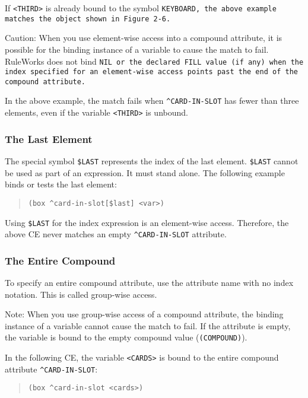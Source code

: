 If \verb|<THIRD>| is already bound to the symbol \tt{KEYBOARD}, the
above example matches the object shown in Figure 2-6.

Caution: When you use element-wise access into a compound attribute,
it is possible for the binding instance of a variable to cause the
match to fail.  RuleWorks does not bind \tt{NIL} or the declared
\tt{FILL} value (if any) when the index specified for an element-wise
access points past the end of the compound attribute.

In the above example, the match fails when \verb|^CARD-IN-SLOT| has
fewer than three elements, even if the variable \verb|<THIRD>| is
unbound.

\subsubsection{The Last Element}

  The special symbol \verb|$LAST| represents the index of the
  last element. \verb|$LAST| cannot be used as part of an
  expression. It must stand alone. The following example
  binds or tests the last element:
\begin{quote}
\begin{verbatim}
(box ^card-in-slot[$last] <var>)
\end{verbatim}
\end{quote}

Using \verb|$LAST| for the index expression is an element-wise
access. Therefore, the above CE never matches an empty
\verb|^CARD-IN-SLOT| attribute.

\subsubsection{The Entire Compound}

  To specify an entire compound attribute, use the
  attribute name with no index notation. This is called
  group-wise access.

  Note: When you use group-wise access of a compound
  attribute, the binding instance of a variable cannot
  cause the match to fail. If the attribute is empty, the
  variable is bound to the empty compound value
  (\verb|(COMPOUND)|).

  In the following CE, the variable \verb|<CARDS>| is bound to
  the entire compound attribute \verb|^CARD-IN-SLOT|:
\begin{quote}
\begin{verbatim}
(box ^card-in-slot <cards>)
\end{verbatim}
\end{quote}

